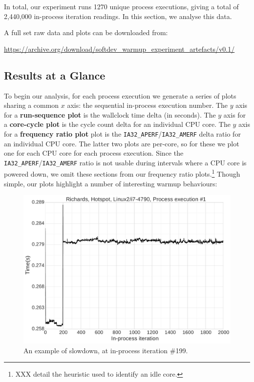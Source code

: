 \documentclass[preprint,numbers,10pt]{sigplanconf}
\begin{document}
In total, our experiment runs  1270 unique process executions, giving a total
of 2,440,000 in-process iteration readings.
In this section, we analyse this data.

A full set raw data and plots can be downloaded from:
\vspace{-.5em}
\begin{center}
{\small%
\url{https://archive.org/download/softdev_warmup_experiment_artefacts/v0.1/}
}
\end{center}

\subsection{Results at a Glance}

To begin our analysis, for each
process execution we generate a series of plots sharing a common $x$
axis: the sequential in-process execution number. The $y$ axis for a
\textbf{run-sequence plot} is the wallclock time delta (in seconds). The $y$
axis for a \textbf{core-cycle plot} is the cycle count delta for an individual
CPU core. The $y$ axis for a \textbf{frequency ratio plot} plot is the
\texttt{IA32\_APERF}/\texttt{IA32\_AMERF} delta ratio for an individual CPU
core. The latter two plots are per-core, so for these we plot one for each CPU
core for each process execution. Since the
\texttt{IA32\_APERF}/\texttt{IA32\_AMERF} ratio is not usable during intervals
where a CPU core is powered down, we omit these sections from our frequency
ratio plots.\footnote{XXX detail the heuristic used to identify an idle core.}
Though simple, our plots highlight a number of interesting warmup behaviours:

\begin{figure}[tbp]
\includegraphics[width=.475\textwidth]{examples/slowdown1}
\caption{An example of slowdown, at in-process iteration \#199.}
\label{fig:examples:slowdown1}
\end{figure}
\end{document}
